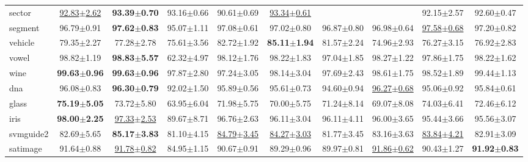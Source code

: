 \documentclass{article}
\begin{document}
\begin{table*}[t]
\begin{tabular*}{\linewidth}{@{\extracolsep{-0.25cm}}lccccccccc}
sector             &\underline{92.83$\pm$2.62} & \textbf{93.39$\pm$0.70}  &93.16$\pm$0.66      &90.61$\pm$0.69            &\underline{93.34$\pm$0.61}                    &\                         &\                   &92.15$\pm$2.57            &92.60$\pm$0.47\\
segment            &96.79$\pm$0.91             & \textbf{97.62$\pm$0.83}  &95.07$\pm$1.11      &97.08$\pm$0.61            &97.02$\pm$0.80       &96.87$\pm$0.80    &96.98$\pm$0.64             &\underline{97.58$\pm$0.68}&97.20$\pm$0.82\\
vehicle            &79.35$\pm$2.27             & 77.28$\pm$2.78           &75.61$\pm$3.56      &82.72$\pm$1.92            &\textbf{85.11$\pm$1.94}       &81.57$\pm$2.24    &74.96$\pm$2.93             &76.27$\pm$3.15            &76.92$\pm$2.83\\
vowel              &98.82$\pm$1.19             &\textbf{98.83$\pm$5.57}   &62.32$\pm$4.97      &98.12$\pm$1.76            &98.22$\pm$1.83       &97.04$\pm$1.85    &98.27$\pm$1.22             &97.86$\pm$1.75            &98.22$\pm$1.62\\
wine               &\textbf{99.63$\pm$0.96}    &\textbf{99.63$\pm$0.96}   &97.87$\pm$2.80      &97.24$\pm$3.05            &98.14$\pm$3.04       &97.69$\pm$2.43    &98.61$\pm$1.75             &98.52$\pm$1.89            &99.44$\pm$1.13            \\
dna                &96.08$\pm$0.83             &\textbf{96.30$\pm$0.79}   &92.02$\pm$1.50      &95.89$\pm$0.56            &95.61$\pm$0.73       &94.60$\pm$0.94    &\underline{96.27$\pm$0.68}             &95.06$\pm$0.92            &95.84$\pm$0.61\\
glass              &\textbf{75.19$\pm$5.05}    & 73.72$\pm$5.80           &63.95$\pm$6.04      &71.98$\pm$5.75            &70.00$\pm$5.75       &71.24$\pm$8.14    &69.07$\pm$8.08             &74.03$\pm$6.41            &72.46$\pm$6.12\\
iris               &\textbf{98.00$\pm$2.25}    &\underline{97.33$\pm$2.53}&89.67$\pm$8.71      &96.76$\pm$2.63            &96.11$\pm$3.04       &96.11$\pm$4.11    &96.00$\pm$3.65             &95.44$\pm$3.66            &95.56$\pm$3.07\\
svmguide2          &82.69$\pm$5.65             &\textbf{85.17$\pm$3.83}   &81.10$\pm$4.15      &\underline{84.79$\pm$3.45}&\underline{84.27$\pm$3.03}  &81.77$\pm$3.45    &83.16$\pm$3.63             &\underline{83.84$\pm$4.21}            &82.91$\pm$3.09\\
satimage           &91.64$\pm$0.88             &\underline{91.78$\pm$0.82}&84.95$\pm$1.15      &90.67$\pm$0.91            &89.29$\pm$0.96       &89.97$\pm$0.81    &\underline{91.86$\pm$0.62} &90.43$\pm$1.27            &\textbf{91.92$\pm$0.83}\\
\bottomrule
\end{tabular*}
\vspace{-0.6cm}
\end{table*}
\end{document}
